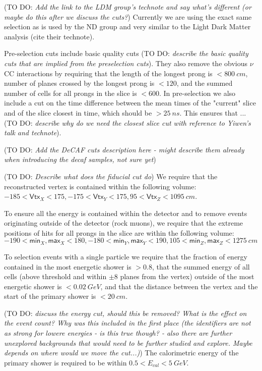 \documentclass[12pt]{article}
\newcommand{\todo }[1]{({\color{red}\sc TO DO: \textit{#1}})}
\begin{document}
\todo{Add the link to the LDM group's technote and say what's different (or maybe do this after we discuss the cuts?}
Currently we are using the exact same selection as is used by the ND group \cite{NOVA-doc-56383} and very similar to the Light Dark Matter analysis (cite their technote).

Pre-selection cuts include basic quality cuts \todo{describe the basic quality cuts that are implied from the preselection cuts}. They also remove the obvious $\nu$CC interactions by requiring that the length of the longest prong is $<800\ \unit{cm}$, number of planes crossed by the longest prong is $<120$, and the summed number of cells for all prongs in the slice is $<600$. In pre-selection we also include a cut on the time difference between the mean times of the "current" slice and of the slice closest in time, which should be $>25\ \unit{ns}$. This ensures that ... \todo{describe why do we need the closest slice cut with reference to Yiwen's talk and technote}.

\todo{Add the DeCAF cuts description here - might describe them already when introducing the decaf samples, not sure yet}

\todo{Describe what does the fiducial cut do}
We require that the reconstructed vertex is contained within the following volume: $-185<\textsf{Vtx}_X<175,-175<\textsf{Vtx}_Y<175, 95<\textsf{Vtx}_Z<1095\ \unit{cm}$.

To ensure all the energy is contained within the detector and to remove events originating outside of the detector (rock muons), we require that the extreme positions of hits for all prongs in the slice are within the following volume: $-190<\textsf{min}_X, \textsf{max}_X<180, -180<\textsf{min}_Y, \textsf{max}_Y<190, 105<\textsf{min}_Z, \textsf{max}_Z<1275\ \unit{cm}$

To selection events with a single particle we require that the fraction of energy contained in the most energetic shower is $>0.8$, that the summed energy of all cells (above threshold and within $\pm8$ planes from the vertex) outside of the most energetic shower is $<0.02\ \unit{GeV}$, and that the distance between the vertex and the start of the primary shower is $<20\ \unit{cm}$.

\todo{discuss the energy cut, should this be removed? What is the effect on the event count? Why was this included in the first place (the identifiers are not as strong for lowere energies - is this true though? - also there are further unexplored backgrounds that would need to be further studied and explore. Maybe depends on where would we move the cut...)}
The calorimetric energy of the primary shower is required to be within $0.5<E_{cal}<5\ \unit{GeV}$.
\end{document}
